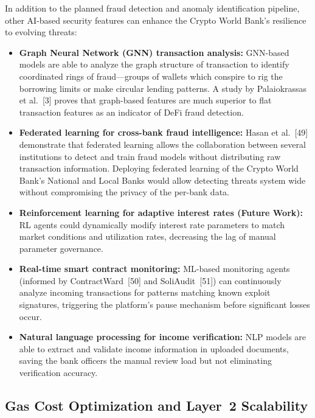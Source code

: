 \documentclass[12pt,a4paper]{report}
\begin{document}
In addition to the planned fraud detection and anomaly identification pipeline, other AI-based security features can enhance the Crypto World Bank's resilience to evolving threats:

\begin{itemize}[noitemsep]
\item \textbf{Graph Neural Network (GNN) transaction analysis:} GNN-based models are able to analyze the graph structure of transaction to identify coordinated rings of fraud---groups of wallets which conspire to rig the borrowing limits or make circular lending patterns. A study by Palaiokrassas et al.~[3] proves that graph-based features are much superior to flat transaction features as an indicator of DeFi fraud detection.

\item \textbf{Federated learning for cross-bank fraud intelligence:} Hasan et al.~[49] demonstrate that federated learning allows the collaboration between several institutions to detect and train fraud models without distributing raw transaction information. Deploying federated learning of the Crypto World Bank's National and Local Banks would allow detecting threats system wide without compromising the privacy of the per-bank data.

\item \textbf{Reinforcement learning for adaptive interest rates (Future Work):} RL agents could dynamically modify interest rate parameters to match market conditions and utilization rates, decreasing the lag of manual parameter governance.

\item \textbf{Real-time smart contract monitoring:} ML-based monitoring agents (informed by ContractWard~[50] and SoliAudit~[51]) can continuously analyze incoming transactions for patterns matching known exploit signatures, triggering the platform's pause mechanism before significant losses occur.

\item \textbf{Natural language processing for income verification:} NLP models are able to extract and validate income information in uploaded documents, saving the bank officers the manual review load but not eliminating verification accuracy.
\end{itemize}

\subsection{Gas Cost Optimization and Layer~2 Scalability}
\end{document}
